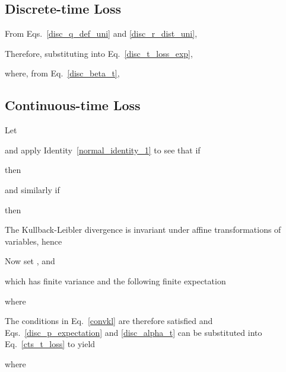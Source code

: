 \documentclass[11pt,table]{article}
\newcommand{\0}[1]{\constvec{0}{#1}}
\newcommand{\1}[1]{\constvec{1}{#1}}
\begin{document}
\subsection{Discrete-time Loss \texorpdfstring{}{}}
From Eqs.~\ref{disc_q_def_uni} and \ref{disc_r_dist_uni},

Therefore, substituting into Eq.~\ref{disc_t_loss_exp},

where, from Eq.~\ref{disc_beta_t},

\subsection{Continuous-time Loss \texorpdfstring{}{}}
Let

and apply Identity~\ref{normal_identity_1} to see that if

then

and similarly if

then 

The Kullback-Leibler divergence is invariant under affine transformations of variables, hence

Now set ,  and

which has finite variance and the following finite expectation

where

The conditions in Eq.~\ref{convkl} are therefore satisfied and Eqs.~\ref{disc_p_expectation} and \ref{disc_alpha_t} can be substituted into Eq.~\ref{cts_t_loss} to yield

where
\end{document}
